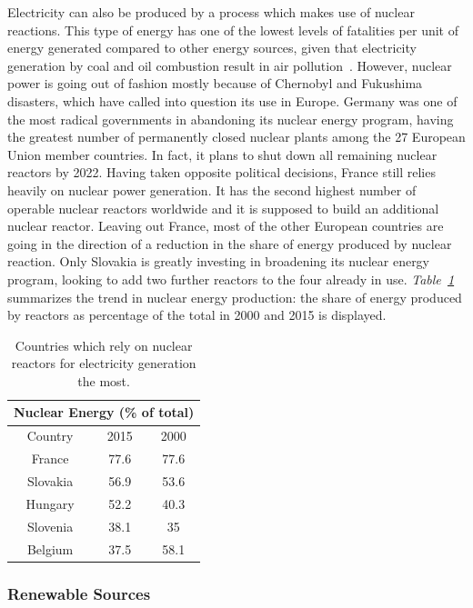\documentclass[a4paper,12pt]{book}
\begin{document}
Electricity can also be produced by a process which makes use of nuclear reactions. This type of energy has one of the lowest levels of fatalities per unit of energy generated compared to other energy sources, given that electricity generation by coal and oil combustion result in air pollution~\cite{markandya2007electricity}. However, nuclear power is going out of fashion mostly because of Chernobyl and Fukushima disasters, which have called into question its use in Europe. Germany was one of the most radical governments in abandoning its nuclear energy program, having the greatest number of permanently closed nuclear plants among the 27 European Union member countries. In fact, it plans to shut down all remaining nuclear reactors by 2022. Having taken opposite political decisions, France still relies heavily on nuclear power generation. It has the second highest number of operable nuclear reactors worldwide and it is supposed to build an additional nuclear reactor. Leaving out France, most of the other European countries are going in the direction of a reduction in the share of energy produced by nuclear reaction. Only Slovakia is greatly investing in broadening its nuclear energy program, looking to add two further reactors to the four already in use. \textit{Table~\ref{Tab:nucE}} summarizes the trend in nuclear energy production: the share of energy produced by reactors as percentage of the total in 2000 and 2015 is displayed.

\begin{table}[tb]
\begin{center}
\begin{tabular}{|c|c|c|}
\hline
\multicolumn{3}{|c|}{Nuclear Energy (\% of total)}\\
\hline
Country & 2015 & 2000 \\
\hline
France & 77.6 & 77.6 \\
Slovakia & 56.9 & 53.6 \\
Hungary & 52.2 & 40.3 \\
Slovenia & 38.1 & 35 \\
Belgium & 37.5 & 58.1\\
\hline
\end{tabular}
\caption{Countries which rely on nuclear reactors for electricity generation the most.}
\label{Tab:nucE}
\end{center}
\end{table}

\subsubsection*{Renewable Sources}
\end{document}
